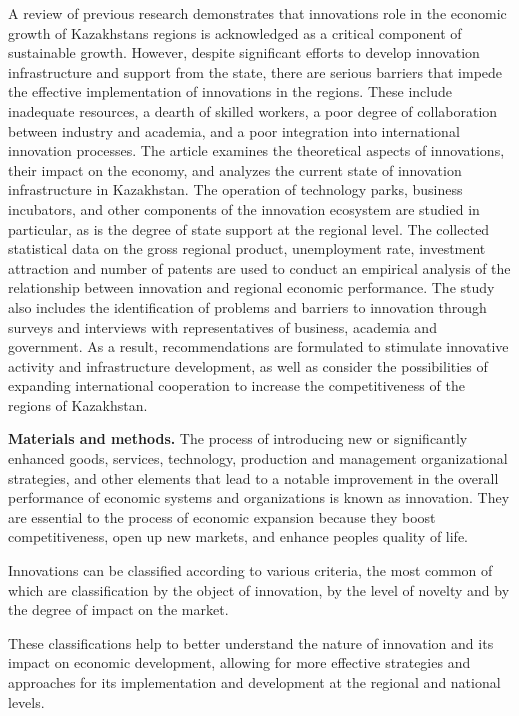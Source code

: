 \begin{multicols}{2}
A review of previous research demonstrates that
innovation\textquotesingle s role in the economic growth of
Kazakhstan\textquotesingle s regions is acknowledged as a critical
component of sustainable growth. However, despite significant efforts to
develop innovation infrastructure and support from the state, there are
serious barriers that impede the effective implementation of innovations
in the regions. These include inadequate resources, a dearth of skilled
workers, a poor degree of collaboration between industry and academia,
and a poor integration into international innovation processes. The
article examines the theoretical aspects of innovations, their impact on
the economy, and analyzes the current state of innovation infrastructure
in Kazakhstan. The operation of technology parks, business incubators,
and other components of the innovation ecosystem are studied in
particular, as is the degree of state support at the regional level. The
collected statistical data on the gross regional product, unemployment
rate, investment attraction and number of patents are used to conduct an
empirical analysis of the relationship between innovation and regional
economic performance. The study also includes the identification of
problems and barriers to innovation through surveys and interviews with
representatives of business, academia and government. As a result,
recommendations are formulated to stimulate innovative activity and
infrastructure development, as well as consider the possibilities of
expanding international cooperation to increase the competitiveness of
the regions of Kazakhstan.

{\bfseries Materials and methods.} The process of introducing new or
significantly enhanced goods, services, technology, production and
management organizational strategies, and other elements that lead to a
notable improvement in the overall performance of economic systems and
organizations is known as innovation. They are essential to the process
of economic expansion because they boost competitiveness, open up new
markets, and enhance people\textquotesingle s quality of life.

Innovations can be classified according to various criteria, the most
common of which are classification by the object of innovation, by the
level of novelty and by the degree of impact on the market.

These classifications help to better understand the nature of innovation
and its impact on economic development, allowing for more effective
strategies and approaches for its implementation and development at the
regional and national levels.


\end{multicols}
